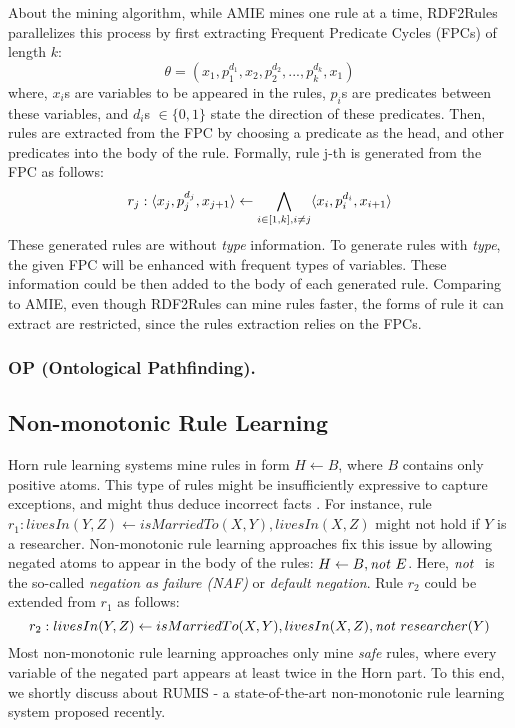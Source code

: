 About the mining algorithm, while AMIE mines one rule at a time, RDF2Rules parallelizes this process by first extracting Frequent Predicate Cycles (FPCs) of length $k$:
\[\theta = (x_1, p_1^{d_1}, x_2, p_2^{d_2}, ..., p_k^{d_k}, x_1)\]
where, $x_i$s are variables to be appeared in the rules, $p_i$s are predicates between these variables, and $d_i$s $\in \{0,1\}$ state the direction of these predicates. Then, rules are extracted from the FPC by choosing a predicate as the head, and other predicates into the body of the rule. Formally, rule j-th is generated from the FPC as follows:
\[r_j: \langle x_j,p_j^{d_j},x_{j+1}\rangle \leftarrow \underset{i \in [1,k], i \ne j}{\bigwedge} \langle x_i,p_i^{d_i},x_{i+1}\rangle \]
These generated rules are without \textit{type} information. To generate rules with \textit{type}, the given FPC will be enhanced with frequent types of variables. These information could be then added to the body of each generated rule. Comparing to AMIE, even though RDF2Rules can mine rules faster, the forms of rule it can extract are restricted, since the rules extraction relies on the FPCs.

\subsubsection{OP (Ontological Pathfinding).}
\subsection{Non-monotonic Rule Learning}
Horn rule learning systems mine rules in form $H \leftarrow B$, where $B$ contains only positive atoms. This type of rules might be insufficiently expressive to capture
exceptions, and might thus deduce incorrect facts \cite{rumis}. For instance, rule $r_1 : livesIn(Y,Z) \leftarrow isMarriedTo(X,Y), livesIn(X,Z)$ might not hold if $Y$ is a researcher. Non-monotonic rule learning approaches \cite{gad2016,rumis} fix this issue by allowing negated atoms to appear in the body of the rules: $H \leftarrow B, \mathit{not}~ E$. Here, $\naf$ is the so-called \textit{negation as failure (NAF)} or \textit{default negation}. Rule $r_2$ could be extended from $r_1$ as follows:
\[r_2 : livesIn(Y,Z) \leftarrow isMarriedTo(X,Y), livesIn(X,Z), \mathit{not}~ researcher(Y)\]
Most non-monotonic rule learning approaches only mine \textit{safe} rules, where every variable of the negated part appears at least twice in the Horn part. To this end, we shortly discuss about RUMIS\cite{rumis} - a state-of-the-art non-monotonic rule learning system proposed recently.
